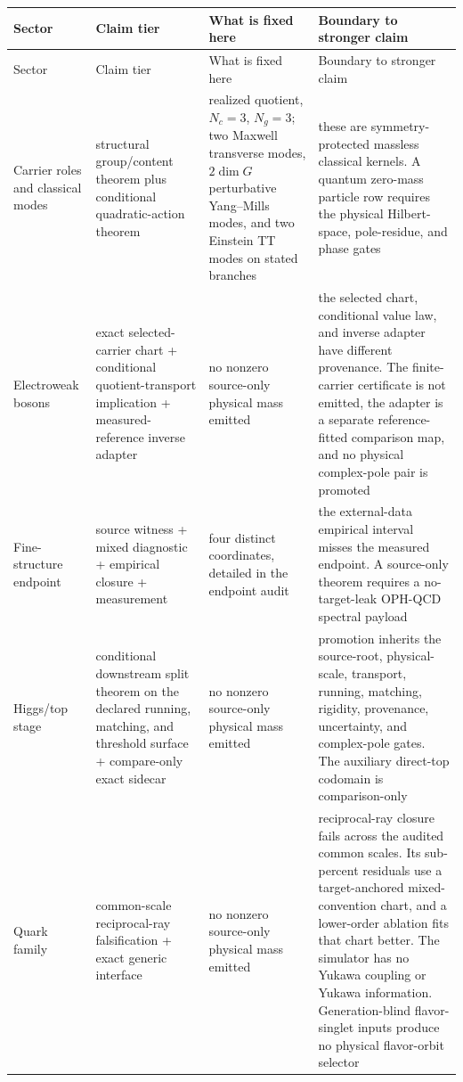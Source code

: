 \scriptsize
\setlength{\tabcolsep}{2pt}
\begin{longtable}{@{}>{\raggedright\arraybackslash}p{}>{\raggedright\arraybackslash}p{}>{\raggedright\arraybackslash}p{}>{\raggedright\arraybackslash}p{}@{}}
\toprule
Sector & Claim tier & What is fixed here & Boundary to stronger claim \\
\midrule
\endfirsthead
\toprule
Sector & Claim tier & What is fixed here & Boundary to stronger claim \\
\midrule
\endhead
\bottomrule
\endfoot
Carrier roles and classical modes & structural group/content theorem plus conditional quadratic-action theorem & realized quotient, \(N_c=3\), \(N_g=3\); two Maxwell transverse modes, \(2\dim G\) perturbative Yang--Mills modes, and two Einstein TT modes on stated branches & these are symmetry-protected massless classical kernels. A quantum zero-mass particle row requires the physical Hilbert-space, pole-residue, and phase gates \\
Electroweak bosons & exact selected-carrier chart + conditional quotient-transport implication + measured-reference inverse adapter & no nonzero source-only physical mass emitted & the selected chart, conditional value law, and inverse adapter have different provenance. The finite-carrier certificate is not emitted, the adapter is a separate reference-fitted comparison map, and no physical complex-pole pair is promoted \\
Fine-structure endpoint & source witness + mixed diagnostic + empirical closure + measurement & four distinct coordinates, detailed in the endpoint audit & the external-data empirical interval misses the measured endpoint. A source-only theorem requires a no-target-leak OPH-QCD spectral payload \\
Higgs/top stage & conditional downstream split theorem on the declared running, matching, and threshold surface + compare-only exact sidecar & no nonzero source-only physical mass emitted & promotion inherits the source-root, physical-scale, transport, running, matching, rigidity, provenance, uncertainty, and complex-pole gates. The auxiliary direct-top codomain is comparison-only \\
Quark family & common-scale reciprocal-ray falsification + exact generic interface & no nonzero source-only physical mass emitted & reciprocal-ray closure fails across the audited common scales. Its sub-percent residuals use a target-anchored mixed-convention chart, and a lower-order ablation fits that chart better. The simulator has no Yukawa coupling or Yukawa information. Generation-blind flavor-singlet inputs produce no physical flavor-orbit selector \\

\end{longtable}
